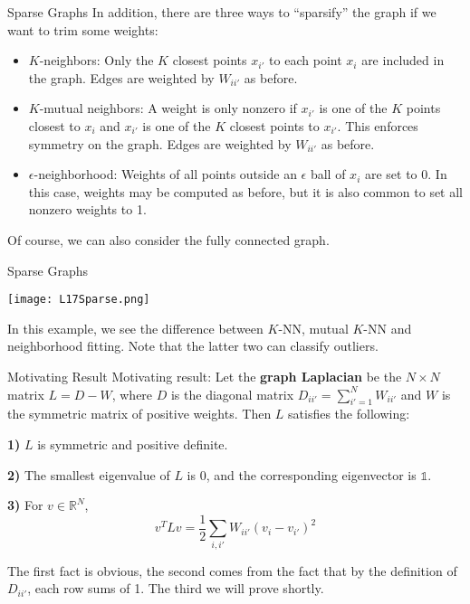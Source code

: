 \documentclass[10pt, table, dvipsnames,xcdraw,handout]{beamer}
\begin{document}
\begin{frame}[fragile]{Sparse Graphs}
In addition, there are three ways to ``sparsify'' the graph if we want to trim some weights:\pause
\begin{itemize}
\item[] $K$-neighbors: Only the $K$ closest points $x_{i'}$ to each point $x_i$ are included in the graph. Edges are weighted by $W_{ii'}$ as before.  \pause
\item[] $K$-mutual neighbors: A weight is only nonzero if $x_{i'}$ is one of the $K$ points closest to $x_i$ and $x_{i'}$ is one of the $K$ closest points to $x_{i'}$. This enforces symmetry on the graph. Edges are weighted by $W_{ii'}$ as before. \pause
\item[] $\epsilon$-neighborhood: Weights of all points outside an $\epsilon$ ball of $x_i$ are set to 0. In this case, weights may be computed as before, but it is also common to set all nonzero weights to 1. \pause
\end{itemize}
Of course, we can also consider the fully connected graph. 
\end{frame}


\begin{frame}[fragile]{Sparse Graphs}
  \begin{minipage}[t][0.7\textheight][t]{\textwidth}
	\centering \texttt{[image: L17Sparse.png]}
  \end{minipage}
  \vfill
\begin{minipage}[t][0.3\textheight][t]{\textwidth}
In this example, we see the difference between $K$-NN, mutual $K$-NN and neighborhood fitting. Note that the latter two can classify outliers. 
\end{minipage}
\end{frame}

\begin{frame}[fragile]{Motivating Result}
Motivating result: Let the \textbf{graph Laplacian} be the $N\times N$ matrix $L = D-W$, where $D$ is the diagonal matrix $D_{ii'} = \sum_{i'=1}^N W_{ii'}$ and $W$ is the symmetric matrix of positive weights. Then $L$ satisfies the following:

\textbf{1)} $L$ is symmetric and positive definite.

\textbf{2)} The smallest eigenvalue of $L$ is 0, and the corresponding eigenvector is $\mathbb{1}$. 

\textbf{3)} For $v\in \mathbb{R}^N$,
$$
v^TLv = \frac12 \sum_{i,i'} W_{ii'}(v_i-v_{i'})^2
$$


The first fact is obvious, the second comes from the fact that by the definition of $D_{ii'}$, each row sums of 1. The third we will prove shortly. 

\end{frame}
\end{document}
